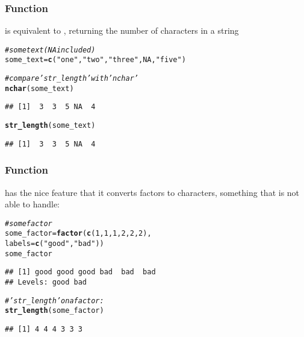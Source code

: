 \documentclass[12pt]{beamer}\usepackage[]{graphicx}\usepackage[]{color}
\makeatletter
\newcommand{\hlnum}[1]{\textcolor[rgb]{0.686,0.059,0.569}{#1}}%
\newcommand{\hlstr}[1]{\textcolor[rgb]{0.192,0.494,0.8}{#1}}%
\newcommand{\hlcom}[1]{\textcolor[rgb]{0.678,0.584,0.686}{\textit{#1}}}%
\newcommand{\hlstd}[1]{\textcolor[rgb]{0.345,0.345,0.345}{#1}}%
\newcommand{\hlkwb}[1]{\textcolor[rgb]{0.69,0.353,0.396}{#1}}%
\newcommand{\hlkwc}[1]{\textcolor[rgb]{0.333,0.667,0.333}{#1}}%
\newcommand{\hlkwd}[1]{\textcolor[rgb]{0.737,0.353,0.396}{\textbf{#1}}}%
\newenvironment{kframe}{%
 \def\at@end@of@kframe{}%
 \ifinner\ifhmode%
  \def\at@end@of@kframe{\end{minipage}}%
  \begin{minipage}{\columnwidth}%
 \fi\fi%
 \def\FrameCommand##1{\hskip\@totalleftmargin \hskip-\fboxsep
 \colorbox{shadecolor}{##1}\hskip-\fboxsep
     \hskip-\linewidth \hskip-\@totalleftmargin \hskip\columnwidth}%
 \MakeFramed {\advance\hsize-\width
   \@totalleftmargin\z@ \linewidth\hsize
   \@setminipage}}%
 {\par\unskip\endMakeFramed%
 \at@end@of@kframe}
\newenvironment{knitrout}{}{} %
\makeatother
\begin{document}

\begin{frame}[fragile]
\frametitle{Function }

 is equivalent to , returning the number of characters in a string
\begin{knitrout}\footnotesize
{}\color{fgcolor}\begin{kframe}
\begin{alltt}
\hlcom{# some text (NA included)}
\hlstd{some_text} \hlkwb{=} \hlkwd{c}\hlstd{(}\hlstr{"one"}\hlstd{,} \hlstr{"two"}\hlstd{,} \hlstr{"three"}\hlstd{,} \hlnum{NA}\hlstd{,} \hlstr{"five"}\hlstd{)}

\hlcom{# compare 'str_length' with 'nchar'}
\hlkwd{nchar}\hlstd{(some_text)}
\end{alltt}
\begin{verbatim}
## [1]  3  3  5 NA  4
\end{verbatim}
\begin{alltt}
\hlkwd{str_length}\hlstd{(some_text)}
\end{alltt}
\begin{verbatim}
## [1]  3  3  5 NA  4
\end{verbatim}
\end{kframe}
\end{knitrout}

\end{frame}


\begin{frame}[fragile]
\frametitle{Function }

 has the nice feature that it converts factors to characters, something that  is not able to handle:
\begin{knitrout}\footnotesize
{}\color{fgcolor}\begin{kframe}
\begin{alltt}
\hlcom{# some factor}
\hlstd{some_factor} \hlkwb{=} \hlkwd{factor}\hlstd{(}\hlkwd{c}\hlstd{(}\hlnum{1}\hlstd{,} \hlnum{1}\hlstd{,} \hlnum{1}\hlstd{,} \hlnum{2}\hlstd{,} \hlnum{2}\hlstd{,} \hlnum{2}\hlstd{),}
                     \hlkwc{labels} \hlstd{=} \hlkwd{c}\hlstd{(}\hlstr{"good"}\hlstd{,} \hlstr{"bad"}\hlstd{))}
\hlstd{some_factor}
\end{alltt}
\begin{verbatim}
## [1] good good good bad  bad  bad 
## Levels: good bad
\end{verbatim}
\begin{alltt}
\hlcom{# 'str_length' on a factor:}
\hlkwd{str_length}\hlstd{(some_factor)}
\end{alltt}
\begin{verbatim}
## [1] 4 4 4 3 3 3
\end{verbatim}
\end{kframe}
\end{knitrout}

\end{frame}
\end{document}
